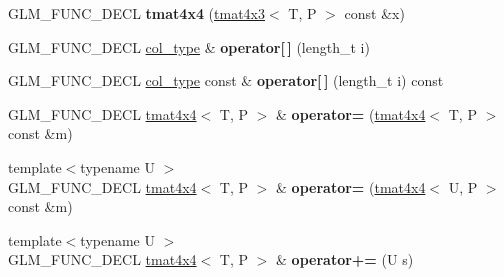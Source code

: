 \begin{DoxyCompactItemize}
\item 
\hypertarget{structglm_1_1detail_1_1tmat4x4_a1171d5bc85975c341d10e5ea766328dd}{G\-L\-M\-\_\-\-F\-U\-N\-C\-\_\-\-D\-E\-C\-L {\bfseries tmat4x4} (\hyperlink{structglm_1_1detail_1_1tmat4x3}{tmat4x3}$<$ T, P $>$ const \&x)}\label{structglm_1_1detail_1_1tmat4x4_a1171d5bc85975c341d10e5ea766328dd}

\item 
\hypertarget{structglm_1_1detail_1_1tmat4x4_a92cd87a0fb94052edec19265cfa505dd}{G\-L\-M\-\_\-\-F\-U\-N\-C\-\_\-\-D\-E\-C\-L \hyperlink{structglm_1_1detail_1_1tvec4}{col\-\_\-type} \& {\bfseries operator\mbox{[}$\,$\mbox{]}} (length\-\_\-t i)}\label{structglm_1_1detail_1_1tmat4x4_a92cd87a0fb94052edec19265cfa505dd}

\item 
\hypertarget{structglm_1_1detail_1_1tmat4x4_a273d9ba353a6a22d3783be76ea840547}{G\-L\-M\-\_\-\-F\-U\-N\-C\-\_\-\-D\-E\-C\-L \hyperlink{structglm_1_1detail_1_1tvec4}{col\-\_\-type} const \& {\bfseries operator\mbox{[}$\,$\mbox{]}} (length\-\_\-t i) const }\label{structglm_1_1detail_1_1tmat4x4_a273d9ba353a6a22d3783be76ea840547}

\item 
\hypertarget{structglm_1_1detail_1_1tmat4x4_a64e75fbb008a4ac755ddf4f0139b56f2}{G\-L\-M\-\_\-\-F\-U\-N\-C\-\_\-\-D\-E\-C\-L \hyperlink{structglm_1_1detail_1_1tmat4x4}{tmat4x4}$<$ T, P $>$ \& {\bfseries operator=} (\hyperlink{structglm_1_1detail_1_1tmat4x4}{tmat4x4}$<$ T, P $>$ const \&m)}\label{structglm_1_1detail_1_1tmat4x4_a64e75fbb008a4ac755ddf4f0139b56f2}

\item 
\hypertarget{structglm_1_1detail_1_1tmat4x4_a43fc3af37580faf4fa172ab4ccc168ad}{{\footnotesize template$<$typename U $>$ }\\G\-L\-M\-\_\-\-F\-U\-N\-C\-\_\-\-D\-E\-C\-L \hyperlink{structglm_1_1detail_1_1tmat4x4}{tmat4x4}$<$ T, P $>$ \& {\bfseries operator=} (\hyperlink{structglm_1_1detail_1_1tmat4x4}{tmat4x4}$<$ U, P $>$ const \&m)}\label{structglm_1_1detail_1_1tmat4x4_a43fc3af37580faf4fa172ab4ccc168ad}

\item 
\hypertarget{structglm_1_1detail_1_1tmat4x4_ad89260d8ab56b889c7c926b0f51bb589}{{\footnotesize template$<$typename U $>$ }\\G\-L\-M\-\_\-\-F\-U\-N\-C\-\_\-\-D\-E\-C\-L \hyperlink{structglm_1_1detail_1_1tmat4x4}{tmat4x4}$<$ T, P $>$ \& {\bfseries operator+=} (U s)}\label{structglm_1_1detail_1_1tmat4x4_ad89260d8ab56b889c7c926b0f51bb589}


\end{DoxyCompactItemize}
